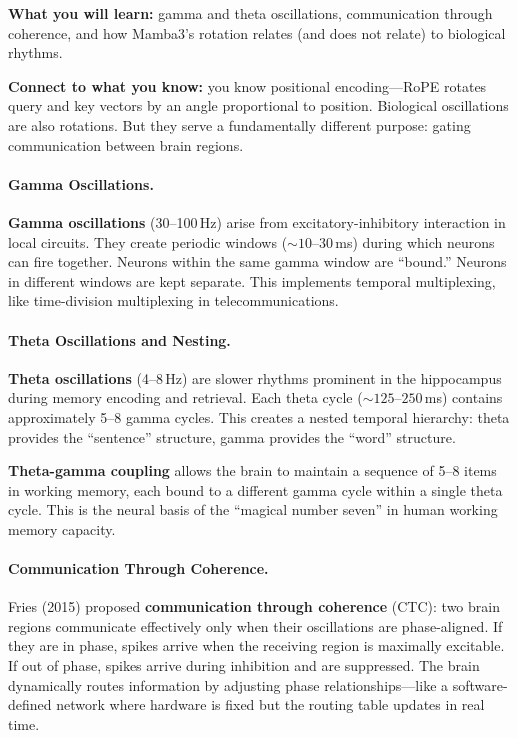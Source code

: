 \documentclass[11pt,a4paper]{article}
\begin{document}
\textbf{What you will learn:} gamma and theta oscillations, communication through coherence, and how Mamba3's rotation relates (and does not relate) to biological rhythms.

\textbf{Connect to what you know:} you know positional encoding---RoPE rotates query and key vectors by an angle proportional to position. Biological oscillations are also rotations. But they serve a fundamentally different purpose: gating communication between brain regions.

\paragraph{Gamma Oscillations.}

\textbf{Gamma oscillations} (30--100\,Hz) arise from excitatory-inhibitory interaction in local circuits. They create periodic windows (${\sim}10\text{--}30$\,ms) during which neurons can fire together. Neurons within the same gamma window are ``bound.'' Neurons in different windows are kept separate. This implements temporal multiplexing, like time-division multiplexing in telecommunications.

\paragraph{Theta Oscillations and Nesting.}

\textbf{Theta oscillations} (4--8\,Hz) are slower rhythms prominent in the hippocampus during memory encoding and retrieval. Each theta cycle (${\sim}125\text{--}250$\,ms) contains approximately 5--8 gamma cycles. This creates a nested temporal hierarchy: theta provides the ``sentence'' structure, gamma provides the ``word'' structure.

\textbf{Theta-gamma coupling} allows the brain to maintain a sequence of 5--8 items in working memory, each bound to a different gamma cycle within a single theta cycle. This is the neural basis of the ``magical number seven'' in human working memory capacity.

\paragraph{Communication Through Coherence.}

Fries (2015) proposed \textbf{communication through coherence} (CTC): two brain regions communicate effectively only when their oscillations are phase-aligned. If they are in phase, spikes arrive when the receiving region is maximally excitable. If out of phase, spikes arrive during inhibition and are suppressed. The brain dynamically routes information by adjusting phase relationships---like a software-defined network where hardware is fixed but the routing table updates in real time.
\end{document}
